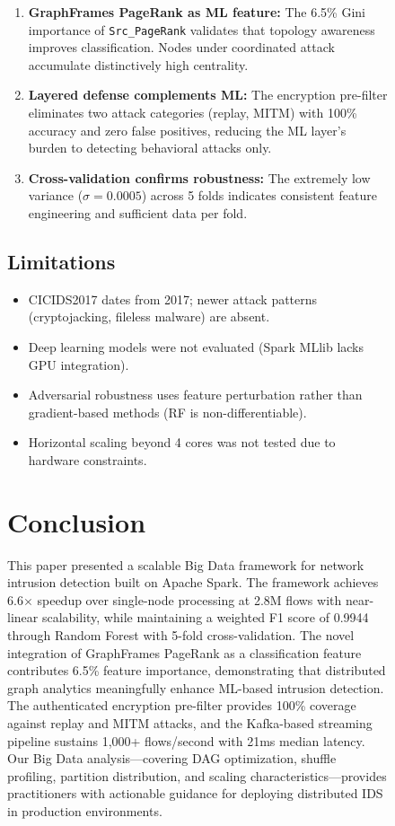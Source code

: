 \documentclass[conference]{IEEEtran}
\begin{document}
\begin{figure}[H]
\begin{enumerate}
    \item \textbf{GraphFrames PageRank as ML feature:} The 6.5\% Gini importance of \texttt{Src\_PageRank} validates that topology awareness improves classification. Nodes under coordinated attack accumulate distinctively high centrality.
    
    \item \textbf{Layered defense complements ML:} The encryption pre-filter eliminates two attack categories (replay, MITM) with 100\% accuracy and zero false positives, reducing the ML layer's burden to detecting behavioral attacks only.
    
    \item \textbf{Cross-validation confirms robustness:} The extremely low variance ($\sigma = 0.0005$) across 5 folds indicates consistent feature engineering and sufficient data per fold.
\end{enumerate}

\subsection{Limitations}

\begin{itemize}
    \item CICIDS2017 dates from 2017; newer attack patterns (cryptojacking, fileless malware) are absent.
    \item Deep learning models were not evaluated (Spark MLlib lacks GPU integration).
    \item Adversarial robustness uses feature perturbation rather than gradient-based methods (RF is non-differentiable).
    \item Horizontal scaling beyond 4 cores was not tested due to hardware constraints.
\end{itemize}


\section{Conclusion}

This paper presented a scalable Big Data framework for network intrusion detection built on Apache Spark. The framework achieves 6.6$\times$ speedup over single-node processing at 2.8M flows with near-linear scalability, while maintaining a weighted F1 score of 0.9944 through Random Forest with 5-fold cross-validation. The novel integration of GraphFrames PageRank as a classification feature contributes 6.5\% feature importance, demonstrating that distributed graph analytics meaningfully enhance ML-based intrusion detection. The authenticated encryption pre-filter provides 100\% coverage against replay and MITM attacks, and the Kafka-based streaming pipeline sustains 1,000+ flows/second with 21ms median latency. Our Big Data analysis---covering DAG optimization, shuffle profiling, partition distribution, and scaling characteristics---provides practitioners with actionable guidance for deploying distributed IDS in production environments.



\end{figure}
\end{document}
